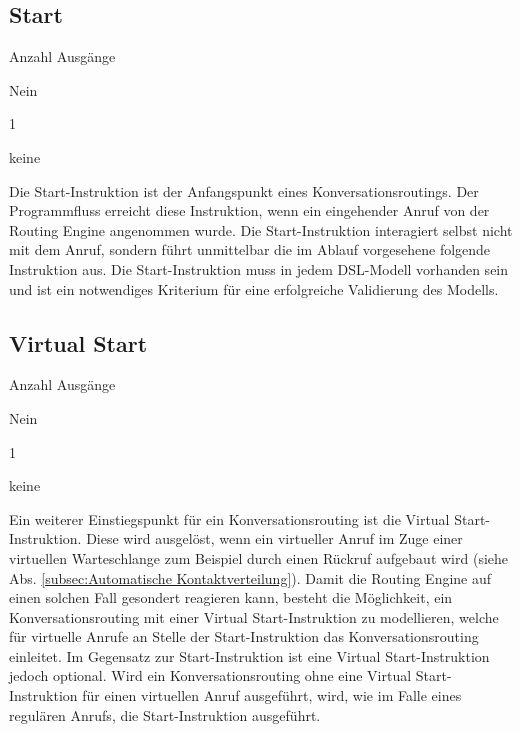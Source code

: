 \subsection{Start}
\label{subsec:start}
\begin{labeling}{Anzahl Ausgänge}
\item [Eingang] Nein
\item [Anzahl Ausgänge] 1
\item [Parameter] keine
\item [Beschreibung] Die Start-Instruktion ist der Anfangspunkt eines Konversationsroutings. Der Programmfluss erreicht diese Instruktion, wenn ein eingehender Anruf von der Routing Engine angenommen wurde. Die Start-Instruktion interagiert selbst nicht mit dem Anruf, sondern führt unmittelbar die im Ablauf vorgesehene folgende Instruktion aus. Die Start-Instruktion muss in jedem DSL-Modell vorhanden sein und ist ein notwendiges Kriterium für eine erfolgreiche Validierung des Modells. 
\end{labeling}

\subsection{Virtual Start}
\label{subsec:virtual start}
\begin{labeling}{Anzahl Ausgänge}
\item [Eingang] Nein
\item [Anzahl Ausgänge] 1
\item [Parameter] keine
\item [Beschreibung] Ein weiterer Einstiegspunkt für ein Konversationsrouting ist die Virtual Start-Instruktion. Diese wird ausgelöst, wenn ein virtueller Anruf im Zuge einer virtuellen Warteschlange zum Beispiel durch einen Rückruf aufgebaut wird (siehe Abs. \ref{subsec:Automatische Kontaktverteilung}). Damit die Routing Engine auf einen solchen Fall gesondert reagieren kann, besteht die Möglichkeit, ein Konversationsrouting mit einer Virtual Start-Instruktion zu modellieren, welche für virtuelle Anrufe an Stelle der Start-Instruktion das Konversationsrouting einleitet. Im Gegensatz zur Start-Instruktion ist eine Virtual Start-Instruktion jedoch optional. Wird ein Konversationsrouting ohne eine Virtual Start-Instruktion für einen virtuellen Anruf ausgeführt, wird, wie im Falle eines regulären Anrufs, die Start-Instruktion ausgeführt.
\end{labeling}

